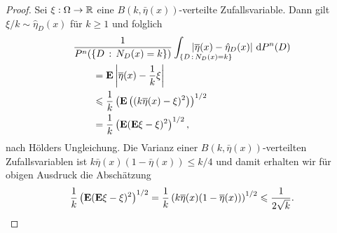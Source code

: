 \begin{proof}
Sei $\xi: \Omega\to\mathbb{R}$ eine $B(k,\bar{\eta}(x))$-verteilte Zufallsvariable. Dann
gilt $\xi/k \sim \hat{\eta}_D(x)$ für $k\ge 1$ und folglich
\begin{align*}
&\frac{1}{P^n(\setdef{D}{N_D(x)=k})}\int_{\setdef{D}{N_D(x)=k}}
\!\!\!\!\!\!\!\!\!\!\!\!\!\!\!\!\!\!\!\!\!\!\!\!\!\!
\abs{\bar{\eta}(x)-\hat{\eta}_D(x)}\dP^n(D)\\
&\qquad=
\E \abs{\bar{\eta}(x)-\frac{1}{k}\xi}\\
&\qquad\le
\frac{1}{k}\left(\E\left((k\bar{\eta}(x)-\xi)^2 \right)\right)^{1/2}\\
&\qquad= \frac{1}{k}\left(\E(\E\xi - \xi)^2 \right)^{1/2},
\end{align*}
nach Hölders Ungleichung. Die Varianz einer $B(k,\bar{\eta}(x))$-verteilten
Zufallsvariablen ist $k\bar{\eta}(x)(1-\bar{\eta}(x))\le k/4$ und damit erhalten
wir für obigen Ausdruck die Abschätzung
\begin{align*}
\frac{1}{k}\left(\textbf{E}(\textbf{E}\xi - \xi)^2 \right)^{1/2} = 
 \frac{1}{k}\left(k{\overline{\eta}}(x)(1-{\overline{\eta}}(x))\right)^{1/2}
\leqslant \frac{1}{2\sqrt{k}}.
\end{align*}


\end{proof}
